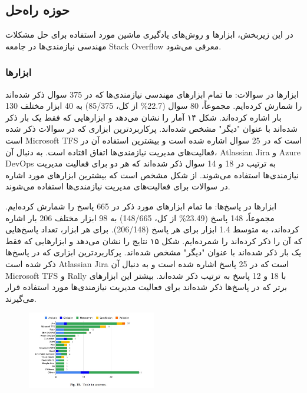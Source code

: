 \documentclass[a4paper,10pt]{article}
\begin{document}
    \subsection{حوزه راه‌حل}

        در این زیربخش، ابزارها و روش‌های یادگیری ماشین مورد استفاده برای حل مشکلات مهندسی نیازمندی‌ها در جامعه Stack Overflow معرفی می‌شود.

        \subsubsection{ابزارها}
        
            ابزارها در سوالات: ما تمام ابزارهای مهندسی نیازمندی‌ها که در 375 سوال ذکر شده‌اند را شمارش کرده‌ایم. مجموعاً، 80 سوال (22.7\% از کل، 85/375) به 40 ابزار مختلف 130 بار اشاره کرده‌اند. شکل ۱۴ آمار را نشان می‌دهد و ابزارهایی که فقط یک بار ذکر شده‌اند با عنوان "دیگر" مشخص شده‌اند. پرکاربردترین ابزاری که در سوالات ذکر شده است Microsoft TFS است که در 25 سوال اشاره شده است و بیشترین استفاده آن در فعالیت‌های مدیریت نیازمندی‌ها اتفاق افتاده است. به دنبال آن، Atlassian Jira و Azure DevOps به ترتیب در 18 و 14 سوال ذکر شده‌اند که هر دو برای فعالیت مدیریت نیازمندی‌ها استفاده می‌شوند. از شکل مشخص است که بیشترین ابزارهای مورد اشاره در سوالات برای فعالیت‌های مدیریت نیازمندی‌ها استفاده می‌شوند.

            ابزارها در پاسخ‌ها: ما تمام ابزارهای مورد ذکر در 665 پاسخ را شمارش کرده‌ایم. مجموعاً، 148 پاسخ (23.49\% از کل، 148/665) به 98 ابزار مختلف 206 بار اشاره کرده‌اند، به متوسط 1.4 ابزار برای هر پاسخ (206/148). برای هر ابزار، تعداد پاسخ‌هایی که آن را ذکر کرده‌اند را شمرده‌ایم. شکل ۱۵ نتایج را نشان می‌دهد و ابزارهایی که فقط یک بار ذکر شده‌اند با عنوان "دیگر" مشخص شده‌اند. پرکاربردترین ابزاری که در پاسخ‌ها ذکر شده است Atlassian Jira است که در 25 پاسخ اشاره شده است و به دنبال آن Microsoft TFS و Rally با 18 و 12 پاسخ به ترتیب ذکر شده‌اند. بیشتر این ابزارهای برتر که در پاسخ‌ها ذکر شده‌اند برای فعالیت مدیریت نیازمندی‌ها مورد استفاده قرار می‌گیرند.

            \begin{figure}
                \centering
                \includegraphics[width=0.5\textwidth]{Image/fig-15.jpg}
            \end{figure}
\end{document}
